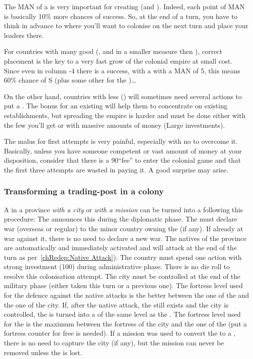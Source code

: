 \begin{playtip}
  The MAN of a \LeaderC is very important for creating \COL (and \TP). Indeed,
  each point of MAN is basically 10\% more chances of success. So, at the end
  of a turn, you have to think in advance to where you'll want to colonise on
  the next turn and place your leaders there.

  For countries with many good \LeaderC (\HIS, \POR and in a smaller measure
  \HOL then \FRA), correct placement is the key to a very fast grow of the
  colonial empire at small cost. Since even in column -4 there is a success,
  with a \LeaderC with a MAN of 5, this means 60\% chance of S (plus some
  other for the \undemi)\ldots

  On the other hand, countries with less \LeaderC (\ANG) will sometimes need
  several actions to put a \COL. The bonus for an existing \COL will help them
  to concentrate on existing establishments, but spreading the empire is
  harder and must be done either with the few \LeaderC you'll get or with
  massive amounts of money (Large investments).

  The malus for first attempts is very painful, especially with no \LeaderC to
  overcome it. Basically, unless you have someone competent or vast amount of
  money at your disposition, consider that there is a 90\ducats ``fee'' to
  enter the colonial game and that the first three attempts are wasted in
  paying it. A good surprise may arise.
\end{playtip}


\subsubsection{Transforming a trading-post in a colony}\label{chAdministration:TP to
  Col}
\aparag A \TP in a province \emph{with a city} or \emph{with a mission} can be
turned into a \COL following this procedure:
\bparag The \MAJ announces this during the diplomatic phase.
\bparag The \MAJ must declare war (overseas or regular) to the \ROTW minor
country owning the \Area (if any). If already at war against it, there is no
need to declare a new war.
\bparag The natives of the province are automatically and immediately
activated and will attack at the end of the turn as per~\ref{chRedep:Native
  Attack}).
\bparag The country must spend one \COL action with strong investment
(100\ducats) during administrative phase. There is no die roll to resolve this
colonisation attempt.
\bparag The city must be controlled at the end of the military phase (either
taken this turn or a previous one). The fortress level used for the defence
against the native attacks is the better between the one of the \TP and the
one of the city.
\bparag If, after the native attack, the \TP still exists and the city is
controlled, the \TP is turned into a \COL of the same level as the \TP. The
fortress level used for the \COL is the maximum between the fortress of the
city and the one of the \TP (put a fortress counter for free is needed).
\bparag If a mission was used to convert the \TP to a \COL, there is no need
to capture the city (if any), but the mission can never be removed unless the
\COL is lost.

